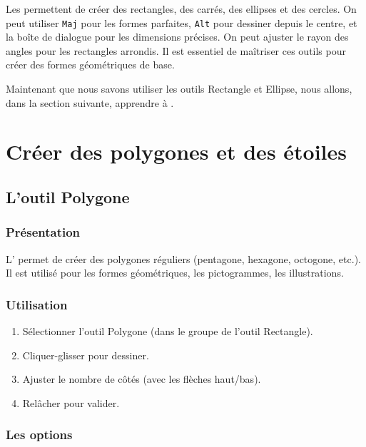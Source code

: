 Les  permettent de créer des rectangles, des carrés, des ellipses et des cercles. On peut utiliser \texttt{Maj} pour les formes parfaites, \texttt{Alt} pour dessiner depuis le centre, et la boîte de dialogue pour les dimensions précises. On peut ajuster le rayon des angles pour les rectangles arrondis. Il est essentiel de maîtriser ces outils pour créer des formes géométriques de base.

Maintenant que nous savons utiliser les outils Rectangle et Ellipse, nous allons, dans la section suivante, apprendre à .

\section{Créer des polygones et des étoiles}

\subsection{L'outil Polygone}

\subsubsection{Présentation}

L' permet de créer des polygones réguliers (pentagone, hexagone, octogone, etc.). Il est utilisé pour les formes géométriques, les pictogrammes, les illustrations.

\subsubsection{Utilisation}

\begin{enumerate}
    \item Sélectionner l'outil Polygone (dans le groupe de l'outil Rectangle).
    \item Cliquer-glisser pour dessiner.
    \item Ajuster le nombre de côtés (avec les flèches haut/bas).
    \item Relâcher pour valider.
\end{enumerate}

\subsubsection{Les options}

